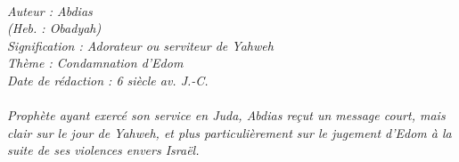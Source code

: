 \BFont
\noindent\hrulefill
{\footnotesize
\textit{
\bigskip
{\centering{}
\\Auteur : Abdias
\\(Heb. : Obadyah)
\\Signification : Adorateur ou serviteur de Yahweh
\\Thème : Condamnation d'Edom
\\Date de rédaction : 6 siècle av. J.-C.\\}
}
\textit{
\\Prophète ayant exercé son service en Juda, Abdias reçut un message court, mais clair sur le jour de Yahweh, et plus particulièrement sur le jugement d'Edom à la suite de ses violences envers Israël.\bigskip
}
}
\par\nobreak\noindent\hrulefill
